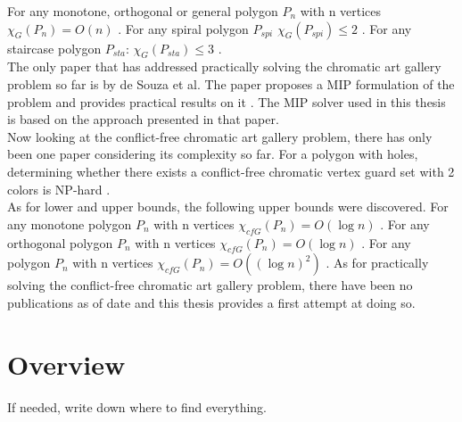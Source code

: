 For any monotone, orthogonal or general polygon $P_n$ with n vertices $\chi_G(P_n) = O(n)$ \cite{bartschi2011coloring}.
For any spiral polygon $P_{spi}$ $\chi_G(P_{spi}) \leq 2$ \cite{erickson2012art}.
For any staircase polygon $P_{sta}$: $\chi_G(P_{sta}) \leq 3$ \cite{erickson2012art}.\\
The only paper that has addressed practically solving the chromatic art gallery problem so far is by de Souza et al. The paper proposes a MIP formulation of the problem and provides practical results on it \cite{zambon2014exact}. The MIP solver used in this thesis is based on the approach presented in that paper.\\
Now looking at the conflict-free chromatic art gallery problem, there has only been one paper considering its complexity so far.
For a polygon with holes, determining whether there exists a conflict-free chromatic vertex guard set with 2 colors is NP-hard \cite{iwamoto2022vertex}.\\
As for lower and upper bounds, the following upper bounds were discovered.
For any monotone polygon $P_n$ with n vertices $\chi_{cfG}(P_n) = O(\log n)$ \cite{bartschi2011coloring}.
For any orthogonal polygon $P_n$ with n vertices $\chi_{cfG}(P_n) = O(\log n)$ \cite{bartschi2011coloring}.
For any polygon $P_n$ with n vertices $\chi_{cfG}(P_n) = O((\log n)^2)$ \cite{bartschi2011coloring}.
As for practically solving the conflict-free chromatic art gallery problem, there have been no publications as of date and this thesis provides a first attempt at doing so.


\section{Overview}
If needed, write down where to find everything.